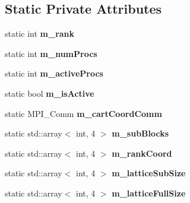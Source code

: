 \subsection*{Static Private Attributes}
\begin{DoxyCompactItemize}
\item 
static int {\bfseries m\+\_\+rank}\hypertarget{classParallel_a5cf373f171edcaedf11030c39bfa6055}{}\label{classParallel_a5cf373f171edcaedf11030c39bfa6055}

\item 
static int {\bfseries m\+\_\+num\+Procs}\hypertarget{classParallel_ae30eb313e84bf0960335d061594b1669}{}\label{classParallel_ae30eb313e84bf0960335d061594b1669}

\item 
static int {\bfseries m\+\_\+active\+Procs}\hypertarget{classParallel_ab5fd380bb070f662b13ffadde8dcfbc4}{}\label{classParallel_ab5fd380bb070f662b13ffadde8dcfbc4}

\item 
static bool {\bfseries m\+\_\+is\+Active}\hypertarget{classParallel_af5ba1dee5fb926c072d216b4d49b0aed}{}\label{classParallel_af5ba1dee5fb926c072d216b4d49b0aed}

\item 
static M\+P\+I\+\_\+\+Comm {\bfseries m\+\_\+cart\+Coord\+Comm}\hypertarget{classParallel_a886d73b09f26abb0ce4b03ad45b3cb22}{}\label{classParallel_a886d73b09f26abb0ce4b03ad45b3cb22}

\item 
static std\+::array$<$ int, 4 $>$ {\bfseries m\+\_\+sub\+Blocks}\hypertarget{classParallel_a62fc29796675994cd44a75b8c91f510a}{}\label{classParallel_a62fc29796675994cd44a75b8c91f510a}

\item 
static std\+::array$<$ int, 4 $>$ {\bfseries m\+\_\+rank\+Coord}\hypertarget{classParallel_ab8c5da042ad34a29239c6c04a907961d}{}\label{classParallel_ab8c5da042ad34a29239c6c04a907961d}

\item 
static std\+::array$<$ int, 4 $>$ {\bfseries m\+\_\+lattice\+Sub\+Size}\hypertarget{classParallel_a578bef5d3e032b2e8c77e986b35fd1b8}{}\label{classParallel_a578bef5d3e032b2e8c77e986b35fd1b8}

\item 
static std\+::array$<$ int, 4 $>$ {\bfseries m\+\_\+lattice\+Full\+Size}\hypertarget{classParallel_a66a4636d98efd9b9f85eaf674a4e5c18}{}\label{classParallel_a66a4636d98efd9b9f85eaf674a4e5c18}


\end{DoxyCompactItemize}
